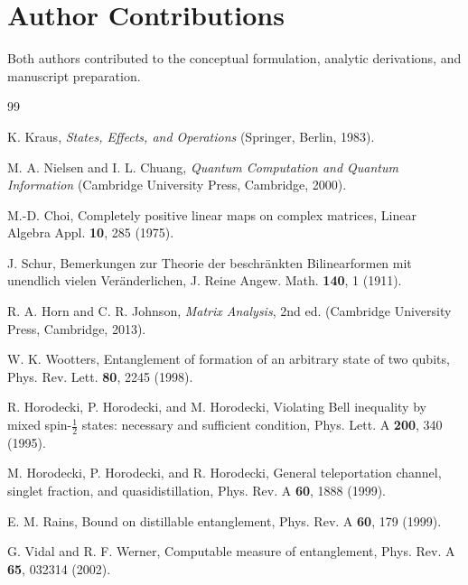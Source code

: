 \documentclass[reprint,aps,pra,superscriptaddress,nofootinbib,longbibliography]{revtex4-2}
\begin{document}
\section*{Author Contributions}
Both authors contributed to the conceptual formulation, analytic derivations, and manuscript preparation.

\begin{thebibliography}{99}

K. Kraus,
\textit{States, Effects, and Operations}
(Springer, Berlin, 1983).

M. A. Nielsen and I. L. Chuang,
\textit{Quantum Computation and Quantum Information}
(Cambridge University Press, Cambridge, 2000).

M.-D. Choi,
Completely positive linear maps on complex matrices,
Linear Algebra Appl. \textbf{10}, 285 (1975).

J. Schur,
Bemerkungen zur Theorie der beschr\"ankten Bilinearformen mit unendlich vielen Ver\"anderlichen,
J. Reine Angew. Math. \textbf{140}, 1 (1911).

R. A. Horn and C. R. Johnson,
\textit{Matrix Analysis}, 2nd ed.
(Cambridge University Press, Cambridge, 2013).



W. K. Wootters,
Entanglement of formation of an arbitrary state of two qubits,
Phys. Rev. Lett. \textbf{80}, 2245 (1998).

R. Horodecki, P. Horodecki, and M. Horodecki,
Violating Bell inequality by mixed spin-\(\frac12\) states: necessary and sufficient condition,
Phys. Lett. A \textbf{200}, 340 (1995).

M. Horodecki, P. Horodecki, and R. Horodecki,
General teleportation channel, singlet fraction, and quasidistillation,
Phys. Rev. A \textbf{60}, 1888 (1999).

E. M. Rains,
Bound on distillable entanglement,
Phys. Rev. A \textbf{60}, 179 (1999).

G. Vidal and R. F. Werner,
Computable measure of entanglement,
Phys. Rev. A \textbf{65}, 032314 (2002).

\end{thebibliography}
\end{document}
